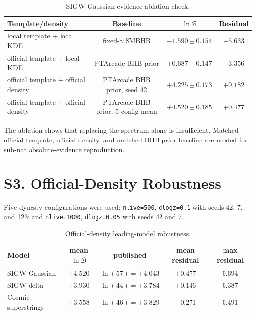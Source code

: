 \documentclass[aps,prl,superscriptaddress,nofootinbib]{revtex4-2}
\begin{document}
\begin{table}[H]
\caption{\label{tab:ablation}SIGW-Gaussian evidence-ablation check.}
\begin{ruledtabular}
\begin{tabular}{lccc}
Template/density & Baseline & $\ln\mathcal{B}$ & Residual \\
\hline
local template + local KDE & fixed-$\gamma$ SMBHB & $-1.590\pm0.154$ & $-5.633$ \\
official template + local KDE & PTArcade BHB prior & $+0.687\pm0.147$ & $-3.356$ \\
official template + official density & PTArcade BHB prior, seed 42 & $+4.225\pm0.173$ & $+0.182$ \\
official template + official density & PTArcade BHB prior, 5-config mean & $+4.520\pm0.185$ & $+0.477$ \\
\end{tabular}
\end{ruledtabular}
\end{table}

The ablation shows that replacing the spectrum alone is insufficient.  Matched
official template, official density, and matched BHB-prior baseline are needed
for sub-nat absolute-evidence reproduction.

\section*{S3. Official-Density Robustness}

Five dynesty configurations were used: \texttt{nlive=500}, \texttt{dlogz=0.1}
with seeds 42, 7, and 123; and \texttt{nlive=1000}, \texttt{dlogz=0.05} with
seeds 42 and 7.

\begin{table}[H]
\caption{\label{tab:robust}Official-density leading-model robustness.}
\begin{ruledtabular}
\begin{tabular}{lcccc}
Model & mean $\ln\mathcal{B}$ & published & mean residual & max residual \\
\hline
SIGW-Gaussian & $+4.520$ & $\ln(57)=+4.043$ & $+0.477$ & $0.694$ \\
SIGW-delta & $+3.930$ & $\ln(44)=+3.784$ & $+0.146$ & $0.387$ \\
Cosmic superstrings & $+3.558$ & $\ln(46)=+3.829$ & $-0.271$ & $0.491$ \\
\end{tabular}
\end{ruledtabular}
\end{table}
\end{document}

